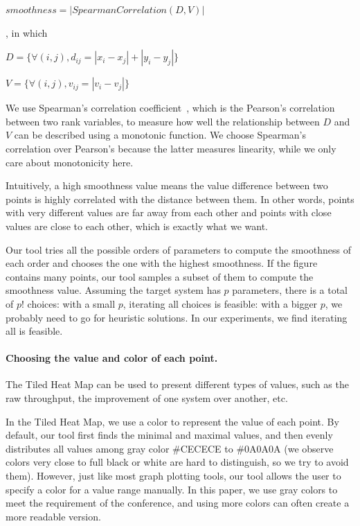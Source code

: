\begin{definition}

    $smoothness = |SpearmanCorrelation(D, V)|$
    
, in which

$D=\{\forall (i,j), d_{ij} = |x_i-x_j|+|y_i-y_j| \}$

$V=\{\forall (i,j), v_{ij} = |v_i-v_j|\}$


\end{definition}

We use Spearman's correlation coefficient~\cite{spearmanCorr}, which is the Pearson's correlation~\cite{pearsonCorr} between two rank variables, to measure how well the relationship between $D$ and $V$ can be described using a monotonic function. We choose Spearman's correlation over Pearson's because the latter measures linearity, while we only care about monotonicity here.

Intuitively, a high smoothness value means the value difference between two points
is highly correlated with the distance between them. In other words,
points with very different values
are far away from each other and points with close values are close to each other,
which is exactly what we want.

Our tool tries all the possible orders of parameters to compute the smoothness of each order
and chooses the one with the highest smoothness. If the figure contains many points,
our tool samples a subset of them to compute the smoothness value. Assuming the target system has $p$ parameters, there
is a total of $p!$ choices: with a small $p$, iterating all choices is feasible: with a 
bigger $p$, we probably need to go for heuristic solutions. In our experiments, we
find iterating all is feasible.

\vspace{-.1in}
\paragraph{Choosing the value and color of each point.} 
The Tiled Heat Map can be used to present different types of values, such as the
raw throughput, the improvement of one system over another, etc.

In the Tiled Heat Map, we use a color
to represent the value of each point. 
By default, our tool first finds the minimal and maximal values, and
then evenly distributes all values among gray color \#CECECE to \#0A0A0A (we observe
colors very close to full black or white are hard to distinguish, so we try to avoid them).
However, just like most graph plotting tools, our tool allows
the user to specify a color for a value range manually.
In this paper, we use gray colors to meet
the requirement of the conference, and using more colors can often create
a more readable version.

